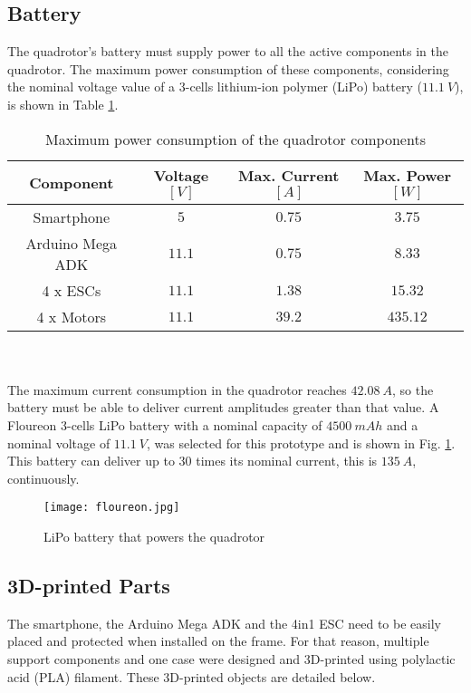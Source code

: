 \subsection{Battery}
The quadrotor's battery must supply power to all the active components in the quadrotor. The maximum power consumption of these components, considering the nominal voltage value of a 3-cells lithium-ion polymer (LiPo) battery ($11.1\ V$), is shown in Table \ref{tb:power}.\\
\begin{table}[h]
\small
\begin{center}
\caption{Maximum power consumption of the quadrotor components}\label{tb:power}
\begin{tabular}{c|c|c|c}\hline
\rule{0pt}{3ex} Component & Voltage $[V]$ & Max. Current $[A]$ & Max. Power $[W]$ \\\hline\hline
\rule{0pt}{3ex}
Smartphone &  $5$ & $0.75$ & $3.75$ \\[0.4ex]
Arduino Mega ADK & $11.1$ & $0.75$ & $8.33$ \\[0.4ex] 
4 x ESCs &  $11.1$ & $1.38$ & $15.32$ \\[0.4ex]
4 x Motors & $11.1$ & $39.2$ & $435.12$ \\[0.4ex]\hline
\end{tabular}
\end{center}
\end{table}
\vspace{-0.5cm}
\\\\The maximum current consumption in the quadrotor reaches $42.08\ A$, so the battery must be able to deliver current amplitudes greater than that value. A Floureon 3-cells LiPo battery with a nominal capacity of $4500\ mAh$ and a nominal voltage of $11.1\ V$, was selected for this prototype and is shown in Fig. \ref{fig:battery}. This battery can deliver up to $30$ times its nominal current, this is $135\ A$, continuously.
\begin{figure}[H]
	\begin{center}
		\texttt{[image: floureon.jpg]}    
		\caption[LiPo battery that powers the Quadrotor]{LiPo battery that powers the quadrotor\protect\footnotemark} 
		\label{fig:battery}
	\end{center}
\end{figure}

\subsection{3D-printed Parts}
The smartphone, the Arduino Mega ADK and the 4in1 ESC need to be easily placed and protected when installed on the frame. For that reason, multiple support components and one case were designed and 3D-printed using polylactic acid (PLA) filament. These 3D-printed objects are detailed below.


